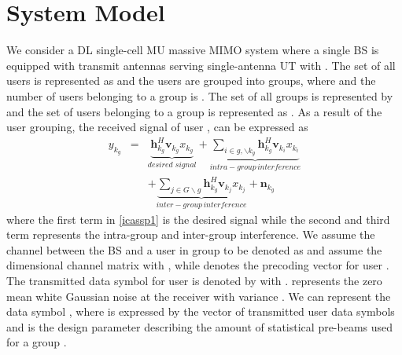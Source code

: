 \documentclass{article}
\begin{document}
\section{System Model}
\label{sys_modl}
We consider a \ac{DL} single-cell \ac{MU} massive \ac{MIMO} system where a single \ac{BS} is equipped with  transmit antennas serving  single-antenna \ac{UT} with . The set of all users is represented as  and the users are grouped into  groups, where  and the number of users belonging to a group is . The set of all groups is represented by  and the set of users belonging to a group is represented as . As a result of the user grouping, the received signal  of user , can be expressed as
\begin{eqnarray} \label{icassp1}
{y}_{k_g} &=& \underbrace{\mathbf{h}_{k_g}^H \mathbf{v}_{k_g} x_{k_g}}_{desired\, \, signal} + \underbrace{\sum_{i \in g,\backslash k_g} \mathbf{h}_{k_g}^H \mathbf{v}_{k_i} x_{k_i}}_{intra-group \, interference}\nonumber \\  &&+ \underbrace{\sum_{j \in G \backslash g} \mathbf{h}_{k_g}^H \mathbf{v}_{k_j} x_{k_j}}_{inter-group \, interference} + \mathbf{n}_{k_g}
\end{eqnarray}  
where the first term in \eqref{icassp1} is the desired signal while the second and third term represents the intra-group and inter-group interference. We assume the channel between the \ac{BS} and a user in group  to be denoted as  and assume the  dimensional channel matrix with
, while  denotes the precoding vector for user . The transmitted data symbol for user  is denoted by  with .  represents the zero mean white Gaussian noise at the receiver with variance . We can represent the data symbol , where  is expressed by the  vector of transmitted user data symbols and  is the design parameter describing the amount of statistical pre-beams used for a group .
\end{document}

